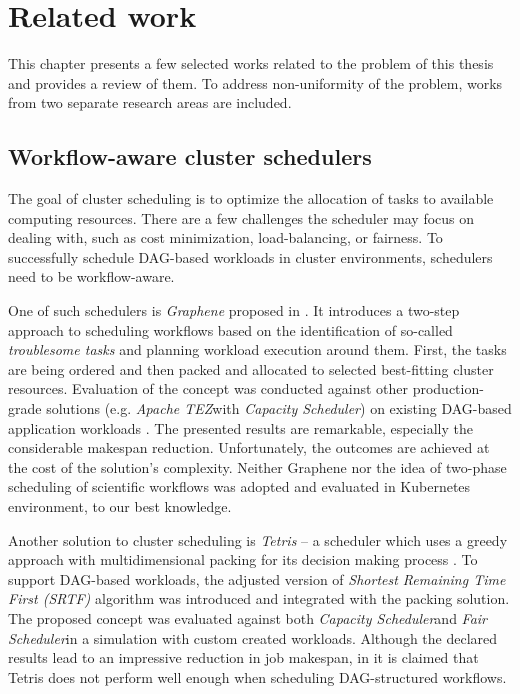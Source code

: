 \thispagestyle{only-cfoot}
\section{Related work}\label{s:RelatedWork}

This chapter presents a few selected works related to the problem of this thesis and provides a review of them.
To address non-uniformity of the problem, works from two separate research areas are included.



\subsection{Workflow-aware cluster schedulers}\label{s:RelatedWork:Schedulers}

The goal of cluster scheduling is to optimize the allocation of tasks to available computing resources.
There are a few challenges the scheduler may focus on dealing with, such as cost minimization, load-balancing, or fairness.
To successfully schedule DAG-based workloads in cluster environments, schedulers need to be workflow-aware.


One of such schedulers is \emph{Graphene} proposed in \cite{b:Graphene}.
It introduces a two-step approach to scheduling workflows based on the identification of so-called \emph{troublesome tasks} and planning workload execution around them.
First, the tasks are being ordered and then packed and allocated to selected best-fitting cluster resources.
Evaluation of the concept was conducted against other production-grade solutions (e.g. \emph{Apache TEZ}\footnotemark[1]  with \emph{Capacity Scheduler}\footnotemark[2]) on existing DAG-based application workloads \cite{b:Graphene}.
The presented results are remarkable, especially the considerable makespan reduction.
Unfortunately, the outcomes are achieved at the cost of the solution's complexity.
Neither Graphene nor the idea of two-phase scheduling of scientific workflows was adopted and evaluated in Kubernetes environment, to our best knowledge.


Another solution to cluster scheduling is \emph{Tetris} -- a scheduler which uses a greedy approach with multidimensional packing for its decision making process \cite{b:Tetris}.
To support DAG-based workloads, the adjusted version of \emph{Shortest Remaining Time First (SRTF)} algorithm was introduced and integrated with the packing solution.
The proposed concept was evaluated against both \emph{Capacity Scheduler}\footnotemark[2] and \emph{Fair Scheduler}\footnotemark[3] in a simulation with custom created workloads.
Although the declared results lead to an impressive reduction in job makespan, in \cite{b:Graphene} it is claimed that Tetris does not perform well enough when scheduling DAG-structured workflows.

